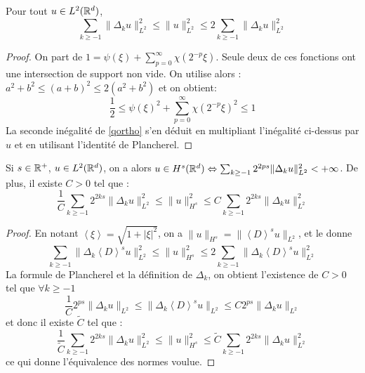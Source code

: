\documentclass[11pt,a4paper]{article}
\begin{document}
\begin{lemma}\label{lqortho}
Pour tout $u\in L^2(\mathbb R^d)$, 
\begin{equation}\label{qortho}
\sum_{k \geq -1} \|\Delta_k u \|^2_{L^2} \leq \| u \|^2_{L^2} \leq 2 \sum_{k \geq -1} \|\Delta_k u \|^2_{L^2} 
\end{equation}
\end{lemma}

\begin{proof}
On part de $1= \psi(\xi) + \sum_{p=0}^\infty \chi(2^{-p} \xi)$.
Seule deux de ces fonctions ont une intersection de support non vide. On utilise alors : $a^2 +b^2 \leq (a+b)^2 \leq 2(a^2 +b^2)$ et on obtient:
$$ \frac{1}{2} \leq \psi(\xi)^2 + \sum_{p=0}^\infty \chi(2^{-p} \xi)^2 \leq 1$$
La seconde inégalité de \eqref{qortho} s'en déduit en multipliant l'inégalité ci-dessus par $\hat{u}$ et en utilisant l'identité de Plancherel.
\end{proof}

\begin{prop}
Si $s\in \mathbb R^+$, $u\in L^2(\mathbb R^d)$, on a alors $u\in H^s(\mathbb R^d) \Leftrightarrow \sum_{k\geq -1}2^{2ps}\|\Delta_k u \|_{L^2}^2 < +\infty$. De plus, il existe $C>0$ tel que :
\begin{equation}\label{carac_sobol}
\frac{1}{C}\sum_{k\geq -1}2^{2ks}\|\Delta_k u \|_{L^2}^2 \leq \|u\|_{H^s}^2 \leq C \sum_{k\geq -1}2^{2ks}\|\Delta_k u \|_{L^2}^2 
\end{equation}
\end{prop}

\begin{proof}
En notant $\left\langle \xi \right\rangle = \sqrt{1 + |\xi|^2}$, on a $\|u\|_{H^s} = \|\left\langle D \right\rangle^su\|_{L^2}$, et le  donne 
\[\sum_{k \geq -1} \|\Delta_k \left\langle D \right\rangle^su \|^2_{L^2} \leq \| u \|^2_{H^s} \leq 2 \sum_{k \geq -1} \|\Delta_k \left\langle D \right\rangle^su \|^2_{L^2} \]
La formule de Plancherel et la définition de $\Delta_k$, on obtient l'existence de $C>0$ tel que $\forall k \geq -1$
\[\frac{1}{C}2^{ps}\|\Delta_ku\|_{L^2} \leq  \|\Delta_k\left\langle D \right\rangle^su\|_{L^2} \leq C2^{ps}\|\Delta_ku\|_{L^2} \]
et donc il existe $\tilde{C}$ tel que :
\[
\frac{1}{\tilde{C}}\sum_{k\geq -1}2^{2ks}\|\Delta_k u \|_{L^2}^2 \leq \|u\|_{H^s}^2 \leq \tilde{C} \sum_{k\geq -1}2^{2ks}\|\Delta_k u \|_{L^2}^2 \]
ce qui donne l'équivalence des normes voulue.
\end{proof}
\end{document}
